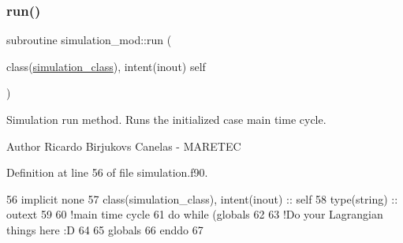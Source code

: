 \mbox{\label{namespacesimulation__mod_a73bd78c4ac76c51f1e10f5847c25c4df}} 
\subsubsection{\texorpdfstring{run()}{run()}}
{\footnotesize\ttfamily subroutine simulation\+\_\+mod\+::run (\begin{DoxyParamCaption}\item[{class(\mbox{\hyperlink{structsimulation__mod_1_1simulation__class}{simulation\+\_\+class}}), intent(inout)}]{self }\end{DoxyParamCaption})\hspace{0.3cm}{\ttfamily [private]}}



Simulation run method. Runs the initialized case main time cycle. 

\begin{DoxyAuthor}{Author}
Ricardo Birjukovs Canelas -\/ M\+A\+R\+E\+T\+EC 
\end{DoxyAuthor}


Definition at line 56 of file simulation.\+f90.


\begin{DoxyCode}
56     \textcolor{keywordtype}{implicit none}
57     \textcolor{keywordtype}{class}(simulation\_class), \textcolor{keywordtype}{intent(inout)} :: self
58     \textcolor{keywordtype}{type}(string) :: outext
59 
60     \textcolor{comment}{!main time cycle}
61     \textcolor{keywordflow}{do} \textcolor{keywordflow}{while} (globals%
62 
63         \textcolor{comment}{!Do your Lagrangian things here :D}
64 
65         globals%
66 \textcolor{keywordflow}{    enddo}
67 
\end{DoxyCode}
